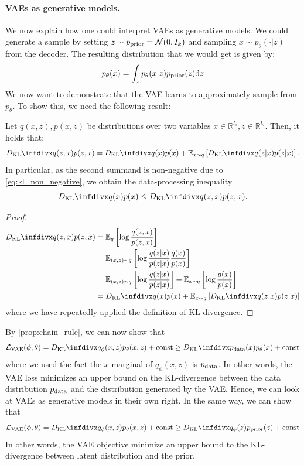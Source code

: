\paragraph{VAEs as generative models.} We now explain how one could interpret VAEs as generative models. We could generate a sample by setting $z\sim p_{\text{prior}}=\mathcal{N}(0,I_k)$ and sampling $x\sim p_\theta(\cdot|z)$ from the decoder. The resulting distribution that we would get is given by:
\begin{equation*}
    p_\theta(x) = \int_z p_\theta(x|z) p_{\text{prior}}(z)\mathrm{d} z
\end{equation*}
We now want to demonstrate that the VAE learns to approximately sample from $p_\theta$. To show this, we need the following result:
\begin{proposition}
Let $q(x,z), p(x,z)$ be distributions over two variables $x\in\mathbb{R}^{l_1},z\in\mathbb{R}^{l_2}$. Then, it holds that:
\begin{align*}
\dkl{q(z,x)}{p(z,x)}= \dkl{q(x)}{p(x)}+\mathbb{E}_{x\sim q}\left[\dkl{q(z|x)}{p(z|x)}\right].
\end{align*}
In particular, as the second summand is non-negative due to \cref{eq:kl_non_negative}, we obtain the data-processing inequality
\begin{align}
\label{eq:kl_upper_bound}
\dkl{q(x)}{p(x)}\leq \dkl{q(z,x)}{p(z,x)}.
\end{align}
\label{prop:chain_rule}
\end{proposition}
\begin{proof}
\begin{align*}
   \dkl{q(z,x)}{p(z,x)}&=\mathbb{E}_{q}\left[
   \log \frac{q(z,x)}{p(z,x)}
   \right]\\
&=\mathbb{E}_{(x,z) \sim q}\left[
   \log \frac{q(z|x)}{p(z|x)}\frac{q(x)}{p(x)}
   \right]\\
&=\mathbb{E}_{(x,z) \sim q}\left[
   \log \frac{q(z|x)}{p(z|x)}\right]+\mathbb{E}_{x\sim q} \left[\log \frac{q(x)}{p(x)}
   \right]\\
&=\dkl{q(x)}{p(x)}+\mathbb{E}_{x\sim q}\left[\dkl{q(z|x)}{p(z|x)}\right]
\end{align*}
where we have repeatedly applied the definition of KL divergence.
\end{proof}
By \cref{prop:chain_rule}, we can now show that
\begin{equation}
    \mathcal{L}_{\text{VAE}}(\phi, \theta) = \dkl{q_\phi(x,z)}{p_\theta(x,z)} +\text{const}\ge \dkl{\pdata(x)}{p_\theta(x)} +\text{const}
    \label{eq:amort_zero}
\end{equation}
where we used the fact the $x$-marginal of $q_\phi(x,z)$ is $p_{\rm{data}}$. In other words, the VAE loss minimizes an upper bound on the KL-divergence between the data distribution $p_{\rm{data}}$ and the distribution generated by the VAE. Hence, we can look at VAEs as generative models in their own right. In the same way, we can show that 
\begin{equation}
    \mathcal{L}_{\text{VAE}}(\phi, \theta) = \dkl{q_\phi(x,z)}{p_\theta(x,z)} +\text{const}\ge \dkl{q_\phi(z)}{\prior(z)} +\text{const}
    \label{eq:amort_one}
\end{equation}
In other words, the VAE objective minimize an upper bound to the KL-divergence between latent distribution and the prior.
